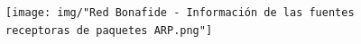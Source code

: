 \begin{figure}[h!]
    \centering                                                       
    \texttt{[image: img/"Red Bonafide - Información de las fuentes receptoras de paquetes ARP.png"]}
    \caption{}
    \label{bonafide:receptoras}
\end{figure}








